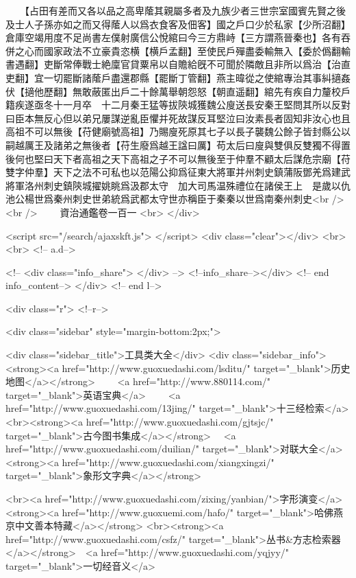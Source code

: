 　　【占田有差而又各以品之高卑䕃其親屬多者及九族少者三世宗室國賓先賢之後及士人子孫亦如之而又得䕃人以爲衣食客及佃客】國之戶口少於私家【少所沼翻】倉庫空竭用度不足尚書左僕射廣信公悅綰曰今三方鼎峙【三方謂燕晉秦也】各有吞併之心而國家政法不立豪貴恣横【横戶孟翻】至使民戶殫盡委輸無入【委於僞翻輸書遇翻】吏斷常俸戰士絶廩官貸粟帛以自贍給旣不可聞於隣敵且非所以爲治【治直吏翻】宜一切罷斷諸䕃戶盡還郡縣【罷斷丁管翻】燕主暐從之使綰專治其事糾擿姦伏【擿他歷翻】無敢蔽匿出戶二十餘萬舉朝怨怒【朝直遥翻】綰先有疾自力釐校戶籍疾遂亟冬十一月卒　十二月秦王猛等拔陝城獲魏公廋送長安秦王堅問其所以反對曰臣本無反心但以弟兄屢謀逆亂臣懼并死故謀反耳堅泣曰汝素長者固知非汝心也且高祖不可以無後【苻健廟號高祖】乃賜廋死原其七子以長子襲魏公餘子皆封縣公以嗣越厲王及諸弟之無後者【苻生廢爲越王諡曰厲】苟太后曰廋與雙俱反雙獨不得置後何也堅曰天下者高祖之天下高祖之子不可以無後至于仲羣不顧太后謀危宗廟【苻雙字仲羣】天下之法不可私也以范陽公抑爲征東大將軍并州刺史鎮蒲阪鄧羌爲建武將軍洛州刺史鎮陝城擢姚眺爲汲郡太守　加大司馬温殊禮位在諸侯王上　是歲以仇池公楊世爲秦州刺史世弟統爲武都太守世亦稱臣于秦秦以世爲南秦州刺史<br />
<br />
　　資治通鑑卷一百一  <br>
   </div> 

<script src="/search/ajaxskft.js"> </script>
 <div class="clear"></div>
<br>
<br>
 <!-- a.d-->

 <!--
<div class="info_share">
</div> 
-->
 <!--info_share--></div>   <!-- end info_content-->
  </div> <!-- end l-->

<div class="r">   <!--r-->



<div class="sidebar"  style="margin-bottom:2px;">

 
<div class="sidebar_title">工具类大全</div>
<div class="sidebar_info">
<strong><a href="http://www.guoxuedashi.com/lsditu/" target="_blank">历史地图</a></strong>　　
<a href="http://www.880114.com/" target="_blank">英语宝典</a>　　
<a href="http://www.guoxuedashi.com/13jing/" target="_blank">十三经检索</a>　
<br><strong><a href="http://www.guoxuedashi.com/gjtsjc/" target="_blank">古今图书集成</a></strong>　
<a href="http://www.guoxuedashi.com/duilian/" target="_blank">对联大全</a>　<strong><a href="http://www.guoxuedashi.com/xiangxingzi/" target="_blank">象形文字典</a></strong>　

<br><a href="http://www.guoxuedashi.com/zixing/yanbian/">字形演变</a>　　<strong><a href="http://www.guoxuemi.com/hafo/" target="_blank">哈佛燕京中文善本特藏</a></strong>
<br><strong><a href="http://www.guoxuedashi.com/csfz/" target="_blank">丛书&方志检索器</a></strong>　<a href="http://www.guoxuedashi.com/yqjyy/" target="_blank">一切经音义</a>　　

